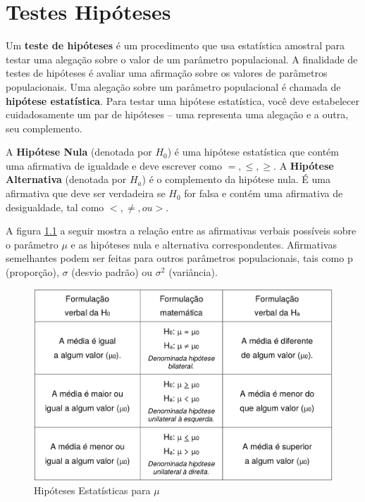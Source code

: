 \chapter{Testes Hipóteses}

Um \textbf{teste de hipóteses} é um procedimento que usa estatística amostral para testar uma alegação sobre o valor de um parâmetro populacional. A finalidade de testes de hipóteses é avaliar uma afirmação sobre os valores de parâmetros populacionais. Uma alegação sobre um parâmetro populacional é chamada de \textbf{hipótese estatística}. Para testar uma hipótese estatística, você deve estabelecer cuidadosamente um par de hipóteses – uma representa uma alegação e a outra, seu complemento.

A \textbf{Hipótese Nula} (denotada por \(H_0\)) é uma hipótese estatística que contém uma
afirmativa de igualdade e deve escrever como \( = , \leq , \geq \). A \textbf{Hipótese Alternativa} (denotada por \(H_a\)) é o complemento da hipótese nula. É uma afirmativa que deve ser verdadeira se \(H_0\) for falsa e contém uma afirmativa de desigualdade, tal como \(<, \neq, ou > \).

A figura \ref{fig:hipoteses-estatisticas} a seguir mostra a relação entre as afirmativas verbais possíveis sobre o parâmetro \(\mu\) e as hipóteses nula e alternativa correspondentes. Afirmativas semelhantes podem ser feitas para outros parâmetros populacionais, tais como p (proporção), \(\sigma\) (desvio padrão) ou \(\sigma^2\) (variância).

\begin{figure}[h]
	\center
	\caption{Hipóteses Estatísticas para \(\mu\)}	
	\label{fig:hipoteses-estatisticas}
	\includegraphics[scale=1.2]{testes-hipoteses/hipoteses-estatisticas.png}
\end{figure}

